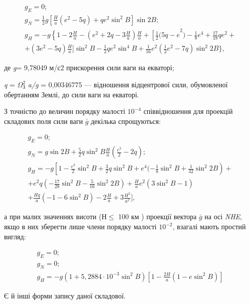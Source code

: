 \[
\begin{array}{l} 
{g_{E} =0;} \\
{g_{N} =\frac{1}{2} g[\frac{H}{a} (e^{2} -5q)+qe^{2} \sin^{2}B]\sin2B;}\\
{g_{H} =-g\left\{1-2\frac{H}{a} -\right. (e^{2} +2q-3\frac{H}{a})
\frac{H}{a} +\left[\frac{1}{2} (5q-e\right. ^{2} )-\frac{1}{8} e^{4} +\frac{17}{18}qe^{2} +} \\ 
{ +(3e^{2} - 5q)\frac{H}{a} ]\sin ^{2} B-\frac{1}{2} qe^{2} \sin ^{4} B+\frac{1}{16} e^{2} 
(\frac{1}{2} e^{2} -7q)\sin ^{2} 2B\},} 
\end{array}
\]
\begin{ESKDexplanation}
\item де \textit{g}= 9,78049 м/с2 прискорення сили ваги на екваторі; 
\item \textit{q} = $\Omega_{\text{З}}^{2} $ \textit{a/g} = 0,00346775 --- відношення 
відцентрової сили, обумовленої обертанням Землі, до сили ваги на екваторі. 
\end{ESKDexplanation}

З точністю до величин порядку малості $10^{-4}$ співвідношення для проекцій складових 
поля сили ваги $\bar{g}$ декілька спрощуються:

\[
 \begin{array}{l} 
{ g_{E} =0;} \\ 
{g_{N} =g\sin 2B+\frac{5}{2} q\sin ^{2} B\frac{H}{a}(\frac{e^{2} }{2} -2q);} \\ 
{g_{H} =-g\left[1-\frac{e^{2} }{2}\sin ^{2} B+\frac{3}{2} q\sin ^{2} B+e^{4}(-\frac{1}{8} \sin ^{2} B+\frac{1}{32} 
\sin ^{2} 2B\right)+} \\ 
{ +e^{2} q\left(-\frac{17}{28} 
\sin ^{2} B-\frac{5}{16} \sin ^{2} 2B\right)+\frac{H}{a} e^{2} (3\sin ^{2} B-1)}\\ 
{ +\frac{Hq}{a} (-1-6\sin ^{2}B)-2\frac{H}{a} +3\frac{H^{2} }{a^{2} }],} 
\end{array}
\] 

а при малих значеннях висоти ($Н\leq$ 100 км ) проекції вектора  $\bar{g}$ на 
осі  \textit{NHE}, якщо в них зберегти лише члени порядку малості $10^{-2}$, 
взагалі мають простий вигляд: 

\[\begin{array}{l} 
{g_{E} =0;}\\
{g_{N} =0;}\\ 
{g_{H} =-g(1+5,2884\cdot 10^{-3} \sin ^{2}B)[1-\frac{2H}{a}
(1-e\sin^{2}B )]} 
\end{array}\] 

Є й інші форми запису даної складової.

